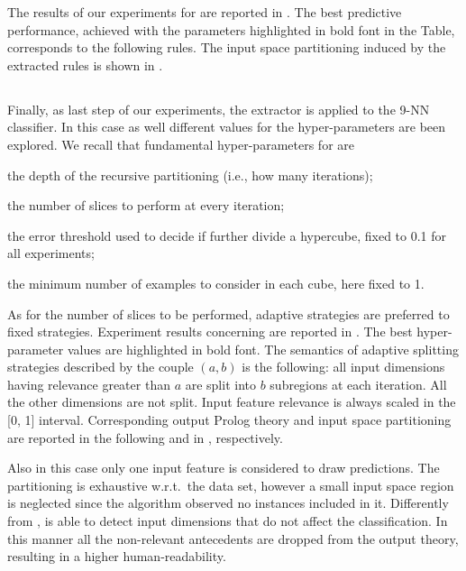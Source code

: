 \documentclass[
]{ceurart}
\begin{document}
The results of our experiments for \iter{} are reported in .
%
The best predictive performance, achieved with the parameters highlighted in bold font in the Table, corresponds to the following rules.
%
%
The input space partitioning induced by the extracted rules is shown in .

\subsection{\gridex{}}



Finally, as last step of our experiments, the \gridex{} extractor is applied to the 9-NN classifier.
%
In this case as well different values for the hyper-parameters are been explored.
%
We recall that fundamental hyper-parameters for \gridex{} are
%
\begin{inlinelist}
	\item the depth of the recursive partitioning (i.e., how many iterations);
	\item the number of slices to perform at every iteration;
	\item the error threshold used to decide if further divide a hypercube, fixed to 0.1 for all experiments;
	\item the minimum number of examples to consider in each cube, here fixed to 1.
\end{inlinelist}
%
As for the number of slices to be performed, adaptive strategies are preferred to fixed strategies.
%
Experiment results concerning \gridex{} are reported in .
%
The best hyper-parameter values are highlighted in bold font.
%
The semantics of adaptive splitting strategies described by the couple $(a, b)$ is the following: all input dimensions having relevance greater than $a$ are split into $b$ subregions at each iteration.
%
All the other dimensions are not split.
%
Input feature relevance is always scaled in the [0, 1] interval.
%
Corresponding output Prolog theory and input space partitioning are reported in the following and in , respectively.


Also in this case only one input feature is considered to draw predictions.
%
The partitioning is exhaustive w.r.t.\ the data set, however a small input space region is neglected since the algorithm observed no instances included in it.
%
Differently from \iter{}, \gridex{} is able to detect input dimensions that do not affect the classification.
%
In this manner all the non-relevant antecedents are dropped from the output theory, resulting in a higher human-readability.
\end{document}
